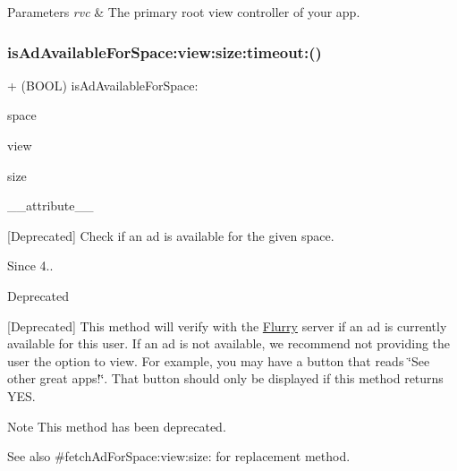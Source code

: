 \begin{DoxyParams}{Parameters}
{\em rvc} & The primary root view controller of your app. \\
\hline
\end{DoxyParams}
\mbox{\label{interfaceFlurryAds_abf047d7df31c163b9b5d4c706827419f}} 
\subsubsection{\texorpdfstring{is\+Ad\+Available\+For\+Space\+:view\+:size\+:timeout\+:()}{isAdAvailableForSpace:view:size:timeout:()}}
{\footnotesize\ttfamily + (B\+O\+OL) is\+Ad\+Available\+For\+Space\+: \begin{DoxyParamCaption}\item[{(N\+S\+String $\ast$)}]{space }\item[{view:(U\+I\+View $\ast$)}]{view }\item[{size:(Flurry\+Ad\+Size)}]{size }\item[{timeout:((deprecated))}]{\+\_\+\+\_\+attribute\+\_\+\+\_\+ }\end{DoxyParamCaption}}



\mbox{[}Deprecated\mbox{]} Check if an ad is available for the given {\ttfamily space}. 

\begin{DoxySince}{Since}
4.. 
\end{DoxySince}
\begin{DoxyRefDesc}{Deprecated}
\item[\hyperlink{deprecated__deprecated000228}{Deprecated}]\end{DoxyRefDesc}


\mbox{[}Deprecated\mbox{]} This method will verify with the \hyperlink{interfaceFlurry}{Flurry} server if an ad is currently available for this user. If an ad is not available, we recommend not providing the user the option to view. For example, you may have a button that reads \char`\"{}\+See other great apps!\char`\"{}. That button should only be displayed if this method returns Y\+ES.

\begin{DoxyNote}{Note}
This method has been deprecated.
\end{DoxyNote}
\begin{DoxySeeAlso}{See also}
\#fetch\+Ad\+For\+Space\+:view\+:size\+: for replacement method.~\newline
 
\end{DoxySeeAlso}

